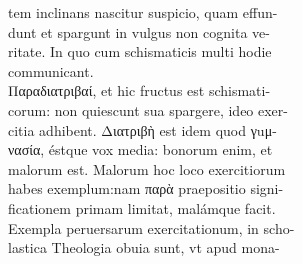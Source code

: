 \documentclass{article}
\begin{document}
\begin{pages}
                tem inclinans nascitur suspicio, quam effun- \\
                dunt et spargunt in vulgus non cognita ve- \\
                ritate. In quo cum schismaticis multi hodie \\
                communicant. \\
                Παραδιατριβαί, et hic fructus est schismati- \\
                corum: non quiescunt sua spargere, ideo exer- \\
                citia adhibent. Διατριβὴ est idem quod γuμ- \\
                νασία, éstque vox media: bonorum enim, et \\
                malorum est. Malorum hoc loco exercitiorum \\
                habes exemplum:nam παρὰ praepositio signi- \\
                ficationem primam limitat, malámque facit. \\
                Exempla peruersarum exercitationum, in scho- \\
                lastica Theologia obuia sunt, vt apud mona- \\
                

\end{pages}
\end{document}
